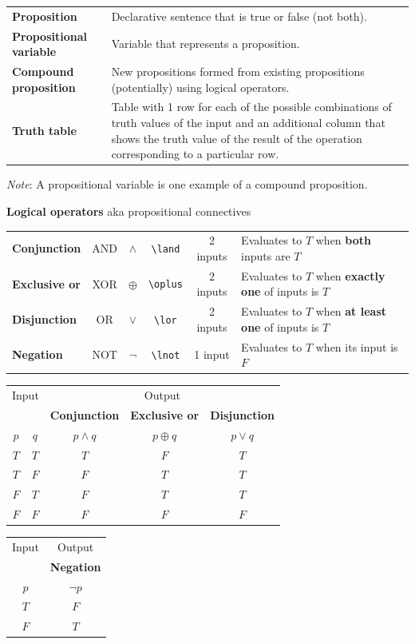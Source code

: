 \documentclass[12pt, oneside]{article}
\begin{document}
\begin{tabular}{lp{5in}}
{\bf Proposition} & Declarative sentence that is true or false (not both).\\
{\bf Propositional variable} & Variable that represents a proposition.\\
{\bf Compound proposition}& New propositions formed from existing propositions (potentially) using logical operators.\\
{\bf Truth table}& Table with 1 row for each of the possible combinations of truth values of the input and 
an additional column that shows the truth value of the result of the operation corresponding to a particular row.
\end{tabular}

{\it Note}: A propositional variable is one example of a compound proposition.

{\bf Logical operators} aka propositional connectives

\begin{tabular}{lccccp{4in}}
{\bf Conjunction} & AND & $\land$ &\verb|\land| & 2 inputs & Evaluates to $T$ when {\bf both} inputs are $T$\\
{\bf Exclusive or} & XOR & $\oplus$ &\verb|\oplus| & 2 inputs & Evaluates to $T$ when {\bf exactly one} of inputs is $T$\\
{\bf Disjunction} & OR & $\lor$ &\verb|\lor| & 2 inputs & Evaluates to $T$ when {\bf at least one} of inputs is $T$\\
{\bf Negation} & NOT & $\lnot$ &\verb|\lnot| & 1 input & Evaluates to $T$ when its input is $F$\\
\end{tabular}

\begin{center}
\begin{tabular}{cc||c|c|c}
\multicolumn{2}{c||}{Input}  & \multicolumn{3}{c}{Output} \\
 & & {\bf Conjunction} &  {\bf Exclusive or} & {\bf Disjunction} \\
$p$ & $q$ & $p \land q$ &  $p  \oplus  q$ & $p \lor  q$ \\
\hline
$T$ & $T$ & $T$ & $F$ & $T$\\
$T$ & $F$ & $F$ & $T$ & $T$\\
$F$ & $T$ & $F$ & $T$ & $T$\\
$F$ & $F$ & $F$ & $F$ & $F$\\
\end{tabular}
\qquad \qquad\qquad
\begin{tabular}{c||c}
Input & Output \\
 & {\bf Negation} \\
$p$ & $\lnot p$ \\
\hline
$T$ & $F$ \\
$F$ & $T$\\
\end{tabular}
\end{center}
\end{document}

